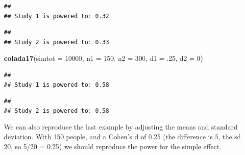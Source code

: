 \documentclass[]{book}
\newenvironment{Shaded}{\begin{snugshade}}{\end{snugshade}}
\newcommand{\DataTypeTok}[1]{\textcolor[rgb]{0.13,0.29,0.53}{#1}}
\newcommand{\DecValTok}[1]{\textcolor[rgb]{0.00,0.00,0.81}{#1}}
\newcommand{\FloatTok}[1]{\textcolor[rgb]{0.00,0.00,0.81}{#1}}
\newcommand{\KeywordTok}[1]{\textcolor[rgb]{0.13,0.29,0.53}{\textbf{#1}}}
\newcommand{\NormalTok}[1]{#1}
\begin{document}
\begin{verbatim}
## 
## Study 1 is powered to: 0.32
\end{verbatim}

\begin{verbatim}
## 
## Study 2 is powered to: 0.33
\end{verbatim}

\begin{Shaded}
\begin{Highlighting}[]
\KeywordTok{colada17}\NormalTok{(}\DataTypeTok{simtot =} \DecValTok{10000}\NormalTok{, }\DataTypeTok{n1 =} \DecValTok{150}\NormalTok{, }\DataTypeTok{n2 =} \DecValTok{300}\NormalTok{, }\DataTypeTok{d1 =} \FloatTok{.25}\NormalTok{, }\DataTypeTok{d2 =} \DecValTok{0}\NormalTok{)}
\end{Highlighting}
\end{Shaded}

\begin{verbatim}
## 
## Study 1 is powered to: 0.58
\end{verbatim}

\begin{verbatim}
## 
## Study 2 is powered to: 0.58
\end{verbatim}

We can also reproduce the last example by adjusting the means and standard deviation. With 150 people, and a Cohen's d of 0.25 (the difference is 5, the sd 20, so 5/20 = 0.25) we should reproduce the power for the simple effect.
\end{document}
